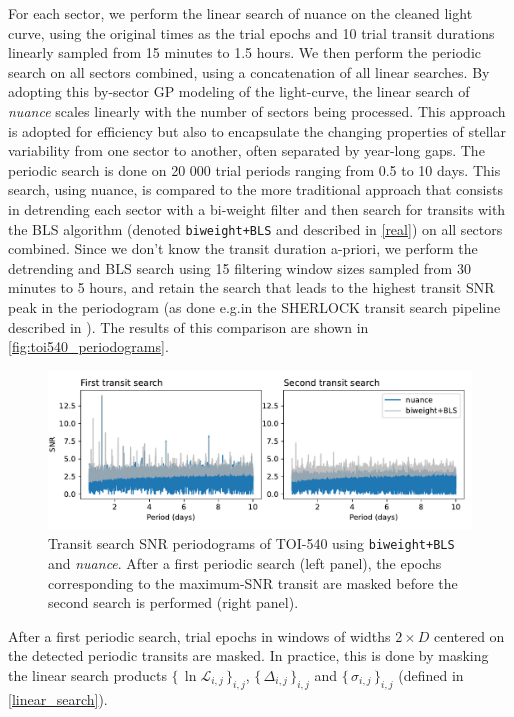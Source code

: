 \documentclass[modern]{aastex631}
\newcommand{\nuancemethod}{\textit{nuance}}
\newcommand{\nuance}{\nuancemethod{}}
\newcommand{\nuancecode}{\textsf{nuance}}
\newcommand{\set}[1]{\{\,#1\,\}}
\begin{document}
For each sector, we perform the linear search of nuance on the cleaned light curve, using the original times as the trial epochs and 10 trial transit durations linearly sampled from 15 minutes to 1.5 hours. We then perform the periodic search on all sectors combined, using a concatenation of all linear searches. By adopting this by-sector GP modeling of the light-curve, the linear search of \nuance{} scales linearly with the number of sectors being processed. This approach is adopted for efficiency but also to encapsulate the changing properties of stellar variability from one sector to another, often separated by year-long gaps. The periodic search is done on 20 000 trial periods ranging from 0.5 to 10 days. This search, using \nuancecode{}, is compared to the more traditional approach that consists in detrending each sector with a bi-weight filter and then search for transits with the BLS algorithm (denoted \texttt{biweight+BLS} and described in \autoref{real}) on all sectors combined. Since we don't know the transit duration a-priori, we perform the detrending and BLS search using 15 filtering window sizes sampled from 30 minutes to 5 hours, and retain the search that leads to the highest transit SNR peak in the periodogram (as done e.g.\;in the SHERLOCK transit search pipeline described in \citealt{Pozuelos2020}). The results of this comparison are shown in \autoref{fig:toi540_periodograms}.
\begin{figure}[H]
    \begin{centering}
        \includegraphics[width=\linewidth]{../workflows/comparison_toi/figures/TOI 540/periodograms.pdf} 
        \caption{Transit search SNR periodograms of TOI-540 using \texttt{biweight+BLS} and \nuance{}. After a first periodic search (left panel), the epochs corresponding to the maximum-SNR transit are masked before the second search is performed (right panel).}
        \label{fig:toi540_periodograms}
    \end{centering}
\end{figure}
After a first periodic search, trial epochs in windows of widths $2\times D$ centered on the detected periodic transits are masked. In practice, this is done by masking the linear search products $\set{\ln\mathcal{L}_{i,j}}_{i, j}$, $\set{\Delta_{i,j}}_{i, j}$ and $\set{\sigma_{i,j}}_{i, j}$ (defined in \autoref{linear_search}).\\\\
\end{document}
